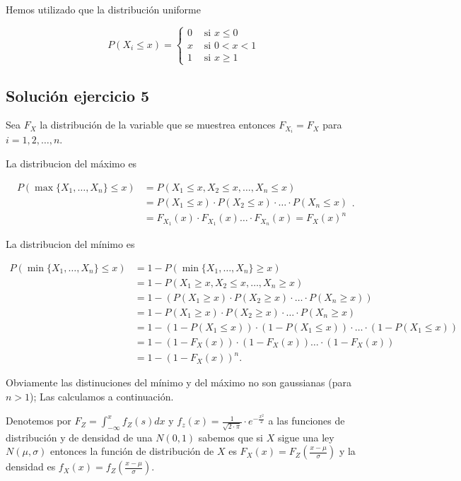 \documentclass[
]{article}
\begin{document}
Hemos utilizado que la distribución uniforme

\[
P(X_i\leq x)=
\left\{\begin{array}{ll}
0 & \mbox{ si } x\leq 0\\
x & \mbox{ si } 0< x < 1\\
1 & \mbox{ si }  x\geq 1
\end{array}
\right.
\]

\hypertarget{soluciuxf3n-ejercicio-5}{%
\subsection{Solución ejercicio 5}\label{soluciuxf3n-ejercicio-5}}

Sea \(F_X\) la distribución de la variable que se muestrea entonces
\(F_{X_i}=F_X\) para \(i=1,2,\ldots,n\).

La distribucion del máximo es

\[
\begin{array}{rl}
P(\max\{X_1,\ldots,X_n\}\leq x)&=P(X_1\leq x,X_2\leq x,\ldots, X_n\leq x)\\
&=P(X_1\leq x)\cdot P(X_2\leq x)\cdot\ldots\cdot P(X_n\leq x)\\
&=F_{X_1}(x)\cdot F_{X_1}(x)\ldots\cdot F_{X_n}(x)=F_{X}(x)^n
\end{array}.
\]

La distribucion del mínimo es

\[
\begin{array}{rl}
P(\min\{X_1,\ldots,X_n\}\leq x)& =1-P(\min\{X_1,\ldots,X_n\}\geq x)\\
& =1- P(X_1\geq x,X_2\leq x,\ldots, X_n\geq x)\\
&=1-\left(P(X_1\geq x)\cdot P(X_2\geq x)\cdot\ldots\cdot P(X_n\geq x)\right)\\
&=1-P(X_1\geq x)\cdot P(X_2\geq x)\cdot\ldots\cdot P(X_n\geq x)\\
&=
1-\left(1-P(X_1\leq x)\right) \cdot \left(1-P(X_1\leq x)\right)\cdot\ldots\cdot\left(1-P(X_1\leq x)\right)\\
&=
1-\left(1-F_{X}(x)\right)\cdot \left(1-F_{X}(x)\right)\ldots\cdot \left(1-F_{X}(x)\right)\\
&=1-  (1-F_{X}(x))^n.
\end{array}
\]

Obviamente las distinuciones del mínimo y del máximo no son gaussianas
(para \(n>1\)); Las calculamos a continuación.

Denotemos por \(F_Z=\int_{-\infty}^x f_Z(s) dx\) y
\(f_z(x)=\frac{1}{\sqrt{2\cdot \pi}} \cdot e^{-\frac{x^2}{2}}\) a las
funciones de distribución y de densidad de una \(N(0,1)\) sabemos que si
\(X\) sigue una ley \(N(\mu,\sigma)\) entonces la función de
distribución de \(X\) es \(F_X(x)=F_Z(\frac{x-\mu}{\sigma})\) y la
densidad es \(f_X(x)=f_Z(\frac{x-\mu}{\sigma})\).
\end{document}

